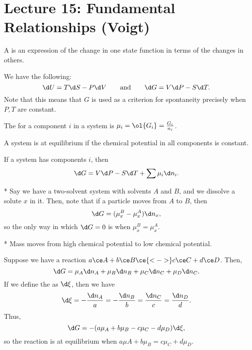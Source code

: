 \section*{Lecture 15: Fundamental Relationships (Voigt)}
\setcounter{section}{15}

\begin{defn}
	A  is an expression of the change in one state function in terms of the changes in others.
\end{defn}

\begin{fact}
	We have the following: \[
		\d U = T\d S - P \d V \qquad \text{and} \qquad \d G = V\d P - S\d T.
	\]
	Note that this means that $G$ is used as a criterion for spontaneity precisely when $P, T$ are constant.
\end{fact}

\begin{defn}
	The  for a component $i$ in a system is $\mu_i = \ol{G_i} = \frac{G_i}{n_i}$.
\end{defn}

\begin{fact}
	A system is at equilibrium if the chemical potential in all components is constant.
\end{fact}

\begin{fact}
	If a system has components $i$, then \[
		\d G = V\d P - S \d T + \sum \mu_i \d n_i.
	\]
\end{fact}

\begin{exm}*
	Say we have a two-solvent system with solvents $A$ and $B$, and we dissolve a solute $x$ in it. Then, note that if a particle moves from $A$ to $B$, then \[
		\d G = (\mu_x^B - \mu_x^A) \d n_x,
	\]
	so the only way in which $\d G = 0$ is when $\mu_x^B = \mu_x^A$.
\end{exm}

\begin{cor}*
	Mass moves from high chemical potential to low chemical potential.
\end{cor}	

\begin{exm}
	Suppose we have a reaction $a \ce A + b \ce B \ce{<->} c \ce C + d \ce D$.
	Then, \[
		\d G = \mu_A \d n_A + \mu_B \d n_B + \mu_C \d n_C + \mu_D \d n_C.
	\]
	If we define the  as $\d \xi$, then we have \[
		\d\xi = -\frac{\d n_A}{a} = -\frac{\d n_B}{b} = \frac{\d n_C}{c} = \frac{\d n_D}{d}.
	\]
	Thus, \[
		\d G = -(a\mu_A + b\mu_B - c\mu_C - d\mu_D) \d \xi,
	\]
	so the reaction is at equilibrium when $a\mu A + b\mu_B = c\mu_C + d\mu_D$.
\end{exm}

